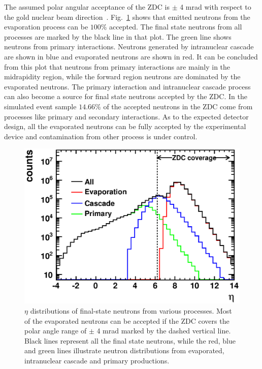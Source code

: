 The assumed polar angular acceptance of the ZDC is $\pm$ 4 mrad with respect to
the gold nuclear beam direction~\cite{Accardi:2012qut}.
Fig.~\ref{fig:neutronZDC} shows that emitted neutrons from the evaporation
process can be $100\%$ accepted. The final state neutrons from all processes are
marked by the black line in that plot. The green line shows neutrons from
primary interactions. Neutrons generated by intranuclear cascade are shown in
blue and evaporated neutrons are shown in red. It can be concluded from this
plot that neutrons from primary interactions are mainly in the midrapidity
region, while the forward region neutrons are dominated by the evaporated
neutrons. The primary interaction and intranuclear cascade process can also
become a source for final state neutrons accepted by the ZDC. In the simulated
event sample $14.66\%$ of the accepted neutrons in the ZDC come from processes
like primary and secondary interactions. As to the expected detector design, all
the evaporated neutrons can be fully accepted by the experimental device and
contamination from other process is under control.

\begin{figure}
\begin{center}
\includegraphics[width=0.7\columnwidth]{plots/chpt7/neutron_ZDC_cuts.eps}
\caption[$\eta$ distribution for all final-state neutrons]{$\eta$ distributions of final-state neutrons from various processes. Most of the evaporated neutrons can be accepted
if the ZDC covers the polar angle range of $\pm$ 4 mrad marked by the
dashed vertical line. Black lines represent all the final state
neutrons, while the red, blue and green lines illustrate neutron distributions
from evaporated, intranuclear cascade and primary productions.}
\label{fig:neutronZDC}
\end{center}
\end{figure}



